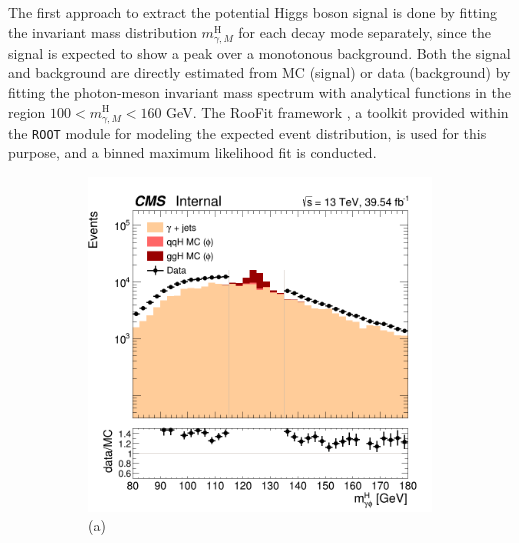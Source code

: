 The first approach to extract the potential Higgs boson signal is done by fitting the invariant mass distribution $m^{\text{H}}_{\gamma, M}$ for each decay mode separately, since the signal is expected to show a peak over a monotonous background. Both the signal and background are directly estimated from MC (signal) or data (background) by fitting the photon-meson invariant mass spectrum with analytical functions in the region $100 < m^{\text{H}}_{\gamma, M} < 160$ GeV. The RooFit framework \cite{CERN:root_roofit}, a toolkit provided within the \verb+ROOT+ module for modeling the expected event distribution, is used for this purpose, and a binned maximum likelihood fit is conducted.
\begin{figure}[!ht]
    \captionsetup[subfigure]{labelformat=empty}
    \vspace*{-0.2cm}
    \centering
    \setlength{\mylength}{\textwidth}
    \begin{subfigure}[t]{0.50\mylength}
        \centering
        \includegraphics[width=0.49\mylength]{resources/plots/Phi3_HiggsMass.png}
        \vspace*{-0.2cm}
        \caption{\footnotesize (a)}
    \end{subfigure}%
    \begin{subfigure}[t]{0.50\mylength}
        \centering

\end{subfigure}
\end{figure}
